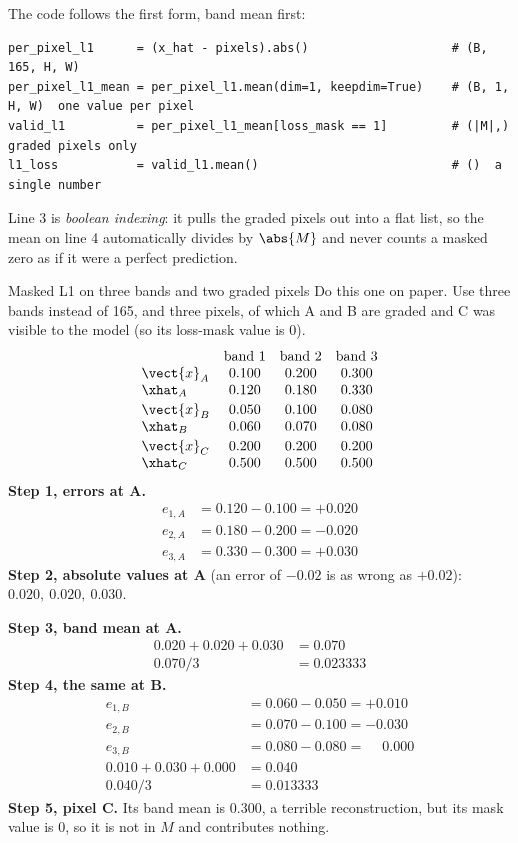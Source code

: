 The code follows the first form, band mean first:
\begin{lstlisting}
per_pixel_l1      = (x_hat - pixels).abs()                    # (B, 165, H, W)
per_pixel_l1_mean = per_pixel_l1.mean(dim=1, keepdim=True)    # (B, 1, H, W)  one value per pixel
valid_l1          = per_pixel_l1_mean[loss_mask == 1]         # (|M|,)  graded pixels only
l1_loss           = valid_l1.mean()                           # ()  a single number
\end{lstlisting}
Line 3 is \emph{boolean indexing}: it pulls the graded pixels out into a flat list, so the mean
on line 4 automatically divides by $\abs{M}$ and never counts a masked zero as if it were a
perfect prediction.

\begin{worked}[label={we:losses:l1}]{Masked L1 on three bands and two graded pixels}
Do this one on paper. Use three bands instead of 165, and three pixels, of which A and B are
graded and C was visible to the model (so its loss-mask value is 0).
\[
\begin{array}{lccc}
 & \text{band 1} & \text{band 2} & \text{band 3} \\
\vect{x}_A & 0.100 & 0.200 & 0.300 \\
\xhat_A & 0.120 & 0.180 & 0.330 \\[2pt]
\vect{x}_B & 0.050 & 0.100 & 0.080 \\
\xhat_B & 0.060 & 0.070 & 0.080 \\[2pt]
\vect{x}_C & 0.200 & 0.200 & 0.200 \\
\xhat_C & 0.500 & 0.500 & 0.500
\end{array}
\]
\textbf{Step 1, errors at A.}
\begin{align*}
e_{1,A} &= 0.120 - 0.100 = +0.020\\
e_{2,A} &= 0.180 - 0.200 = -0.020\\
e_{3,A} &= 0.330 - 0.300 = +0.030
\end{align*}
\textbf{Step 2, absolute values at A} (an error of $-0.02$ is as wrong as $+0.02$):
$0.020,\ 0.020,\ 0.030$.

\textbf{Step 3, band mean at A.}
\begin{align*}
0.020 + 0.020 + 0.030 &= 0.070\\
0.070 / 3 &= 0.023333
\end{align*}
\textbf{Step 4, the same at B.}
\begin{align*}
e_{1,B} &= 0.060 - 0.050 = +0.010\\
e_{2,B} &= 0.070 - 0.100 = -0.030\\
e_{3,B} &= 0.080 - 0.080 = \phantom{+}0.000\\
0.010 + 0.030 + 0.000 &= 0.040\\
0.040 / 3 &= 0.013333
\end{align*}
\textbf{Step 5, pixel C.} Its band mean is $0.300$, a terrible reconstruction, but its mask
value is 0, so it is not in $M$ and contributes nothing.


\end{worked}
